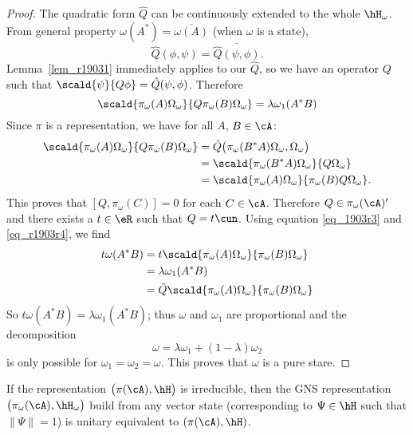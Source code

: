 \begin{proof}
	The quadratic form $\hat Q$ can be continuously extended to the whole $\hH_{\omega}$. From general property $\omega(A^*)=\overline{ \omega(A) }$ (when $\omega$ is a state),
	\[
		\hat Q(\phi,\psi)=\overline{ \hat Q(\psi,\phi) }.
	\]
	Lemma~\ref{lem_r19031} immediately applies to our $\hat Q$, so we have an operator $Q$ such that $\scald{ \psi }{ Q\phi }=\hat Q(\psi,\phi)$. Therefore
	\begin{equation} \label{eq_1903r3}
		\scald{ \pi_{\omega}(A)\Omega_{\omega}}{Q\pi_{\omega}(B)\Omega_{\omega}}=\lambda\omega_1(A^*B)
	\end{equation}
	Since $\pi$ is a representation, we have for all $A$, $B\in\cA$:
	\begin{equation}
		\begin{split}
			\scald{ \pi_{\omega}(A)\Omega_{\omega} }{ Q\pi_{\omega}(B)\Omega_{\omega} }
			&=\hat Q\big( \pi_{\omega}(B^*A)\Omega_{\omega},\Omega_{\omega} \big)\\
			&=\scald{ \pi_{\omega}(B^*A)\Omega_{\omega} }{ Q\Omega_{\omega} }\\
			&=\scald{ \pi_{\omega}(A)\Omega_{\omega} }{ \pi_{\omega}(B)Q\Omega_{\omega} }.
		\end{split}
	\end{equation}
	This proves that $[Q,\pi_{\omega}(C)]=0$ for each $C\in\cA$. Therefore $Q\in\pi_{\omega}(\cA)'$ and there exists a $t\in\eR$ such that $Q=t\cun$. Using equation \eqref{eq_1903r3} and  \eqref{eq_r1903r4}, we find
	\begin{equation}
		\begin{split}
			t\omega(A^*B)&=t\scald{ \pi_{\omega}(A)\Omega_{\omega} }{ \pi_{\omega}(B)\Omega_{\omega} }\\
			&=\lambda\omega_1(A^*B)\\
			&=\hat Q\scald{ \pi_{\omega}(A)\Omega_{\omega} }{ \pi_{\omega}(B)\Omega_{\omega} }\\
		\end{split}
	\end{equation}
	So $t\omega(A^*B)=\lambda\omega_1(A^*B)$; thus $\omega$ and $\omega_1$ are proportional and the decomposition
	\[
		\omega=\lambda\omega_1+(1-\lambda)\omega_2
	\]
	is only possible for $\omega_1=\omega_2=\omega$. This proves that $\omega$ is a pure stare.

\end{proof}


\begin{corollary}
	If the representation $\big( \pi(\cA),\hH \big)$ is irreducible, then the GNS representation $\big( \pi_{\omega}(\cA),\hH_{\omega} \big)$ build from any vector state (corresponding to $\Psi\in\hH$ such that $\| \Psi \|=1$) is unitary equivalent to $(\pi(\cA),\hH)$.
	\label{cor_GNSirredst}
\end{corollary}

